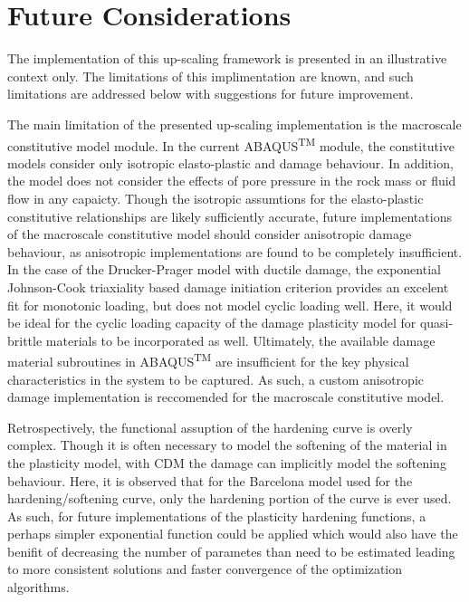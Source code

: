 \section{Future Considerations}

The implementation of this up-scaling framework is presented in an illustrative context only. The limitations of this implimentation are known, and such limitations are addressed below with suggestions for future improvement. 

The main limitation of the presented up-scaling implementation is the macroscale constitutive model module. In the current ABAQUS\textsuperscript{TM} module, the constitutive models consider only isotropic elasto-plastic and damage behaviour. In addition, the model does not consider the effects of pore pressure in the rock mass or fluid flow in any capaicty. Though the isotropic assumtions for the elasto-plastic constitutive relationships are likely sufficiently accurate, future implementations of the macroscale constitutive model should consider anisotropic damage behaviour, as anisotropic implementations are found to be completely insufficient. In the case of the Drucker-Prager model with ductile damage, the exponential Johnson-Cook triaxiality based damage initiation criterion provides an excelent fit for monotonic loading, but does not model cyclic loading well. Here, it would be ideal for the cyclic loading capacity of the damage plasticity model for quasi-brittle materials to be incorporated as well. Ultimately, the available damage material subroutines in ABAQUS\textsuperscript{TM} are insufficient for the key physical characteristics in the system to be captured. As such, a custom anisotropic damage implementation is reccomended for the macroscale constitutive model.

Retrospectively, the functional assuption of the hardening curve is overly complex. Though it is often necessary to model the softening of the material in the plasticity model, with CDM the damage can implicitly model the softening behaviour. Here, it is observed that for the Barcelona model used for the hardening/softening curve, only the hardening portion of the curve is ever used. As such, for future implementations of the plasticity hardening functions, a perhaps simpler exponential function could be applied which would also have the benifit of decreasing the number of parametes than need to be estimated leading to more consistent solutions and faster convergence of the optimization algorithms. 

